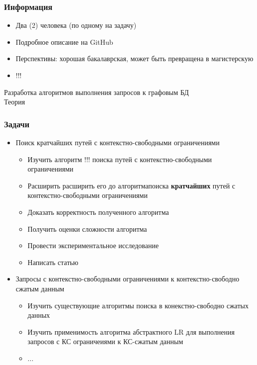 \documentclass{beamer}
\begin{document}
\begin{frame}[fragile]
\transwipe[direction=90]
\frametitle{Информация}
  \begin{itemize}
    \item Два (2) человека (по одному на задачу)
    \item Подробное описание на GitHub
    \item Перспективы: хорошая бакалаврская, может быть превращена в магистерскую
    \item !!!
  \end{itemize}  
\end{frame}
            

\begin{frame}[plain,c]
 \transwipe[direction=90]
 \begin{center}
  \Huge Разработка алгоритмов выполнения запросов к графовым БД \\ Теория
 \end{center}
\end{frame}

\begin{frame}[fragile]
\transwipe[direction=90]
\frametitle{Задачи}
  \begin{itemize}
    \item Поиск кратчайших путей с контекстно-свободными ограничениями
    \begin{itemize}
       \item Изучить алгоритм !!! поиска путей с контекстно-свободными ограничениями
       \item Расширить расширить его до алгоритмапоиска \textbf{кратчайших} путей с контекстно-свободными 
       ограничениями
       \item Доказать корректность полученного алгоритма
       \item Получить оценки сложности алгоритма
       \item Провести экспериментальное исследование
       \item Написать статью
    \end{itemize}
    \item Запросы с контекстно-свободными ограничениями к контекстно-свободно сжатым данным
    \begin{itemize}
       \item Изучить существующие алгоритмы поиска в конекстно-свободно сжатых данных
       \item Изучить применимость алгоритма абстрактного LR для выполнения запросов с КС 
       ограничеиями к КС-сжатым данным
       \item ...
    \end{itemize}

  \end{itemize}  
\end{frame}
\end{document}
